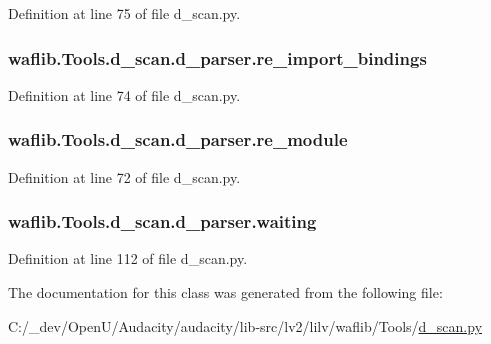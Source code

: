 Definition at line 75 of file d\+\_\+scan.\+py.

\subsubsection[{\texorpdfstring{re\+\_\+import\+\_\+bindings}{re_import_bindings}}]{\setlength{\rightskip}{0pt plus 5cm}waflib.\+Tools.\+d\+\_\+scan.\+d\+\_\+parser.\+re\+\_\+import\+\_\+bindings}\hypertarget{classwaflib_1_1_tools_1_1d__scan_1_1d__parser_a9ce80344c741a4c2c362cac84db06f95}{}\label{classwaflib_1_1_tools_1_1d__scan_1_1d__parser_a9ce80344c741a4c2c362cac84db06f95}


Definition at line 74 of file d\+\_\+scan.\+py.

\subsubsection[{\texorpdfstring{re\+\_\+module}{re_module}}]{\setlength{\rightskip}{0pt plus 5cm}waflib.\+Tools.\+d\+\_\+scan.\+d\+\_\+parser.\+re\+\_\+module}\hypertarget{classwaflib_1_1_tools_1_1d__scan_1_1d__parser_a944d317024ac254ad892584749321592}{}\label{classwaflib_1_1_tools_1_1d__scan_1_1d__parser_a944d317024ac254ad892584749321592}


Definition at line 72 of file d\+\_\+scan.\+py.

\subsubsection[{\texorpdfstring{waiting}{waiting}}]{\setlength{\rightskip}{0pt plus 5cm}waflib.\+Tools.\+d\+\_\+scan.\+d\+\_\+parser.\+waiting}\hypertarget{classwaflib_1_1_tools_1_1d__scan_1_1d__parser_aadca398fd062b9012d20b8a97995db38}{}\label{classwaflib_1_1_tools_1_1d__scan_1_1d__parser_aadca398fd062b9012d20b8a97995db38}


Definition at line 112 of file d\+\_\+scan.\+py.



The documentation for this class was generated from the following file\+:\begin{DoxyCompactItemize}
\item 
C\+:/\+\_\+dev/\+Open\+U/\+Audacity/audacity/lib-\/src/lv2/lilv/waflib/\+Tools/\hyperlink{lilv_2waflib_2_tools_2d__scan_8py}{d\+\_\+scan.\+py}\end{DoxyCompactItemize}
